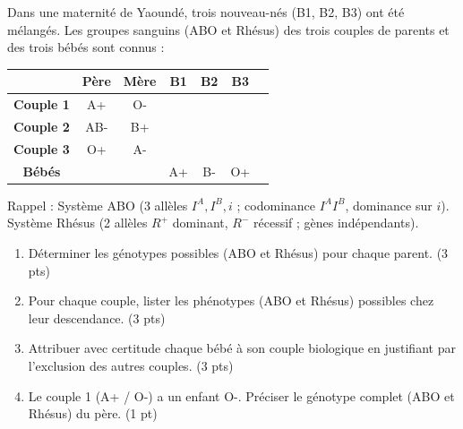\documentclass[11pt]{article}
\begin{document}
\begin{exercice}
Dans une maternité de Yaoundé, trois nouveau-nés (B1, B2, B3) ont été mélangés. Les groupes sanguins (ABO et Rhésus) des trois couples de parents et des trois bébés sont connus :
\begin{center}
\begin{tabular}{|c|c|c|c|c|c|c|}
\hline
 & \textbf{Père} & \textbf{Mère} & \textbf{B1} & \textbf{B2} & \textbf{B3} \\
\hline
\textbf{Couple 1} & A+ & O- &  &  &  \\
\hline
\textbf{Couple 2} & AB- & B+ &  &  &  \\
\hline
\textbf{Couple 3} & O+ & A- &  &  &  \\
\hline
\textbf{Bébés} &  &  & A+ & B- & O+ \\
\hline
\end{tabular}
\end{center}
Rappel : Système ABO (3 allèles $I^A, I^B, i$ ; codominance $I^A I^B$, dominance sur $i$). Système Rhésus (2 allèles $R^+$ dominant, $R^-$ récessif ; gènes indépendants).
\begin{enumerate}
    \item Déterminer les génotypes possibles (ABO et Rhésus) pour chaque parent. (3 pts)
    \item Pour chaque couple, lister les phénotypes (ABO et Rhésus) possibles chez leur descendance. (3 pts)
    \item Attribuer avec certitude chaque bébé à son couple biologique en justifiant par l'exclusion des autres couples. (3 pts)
    \item Le couple 1 (A+ / O-) a un enfant O-. Préciser le génotype complet (ABO et Rhésus) du père. (1 pt)
\end{enumerate}
\end{exercice}
\end{document}
